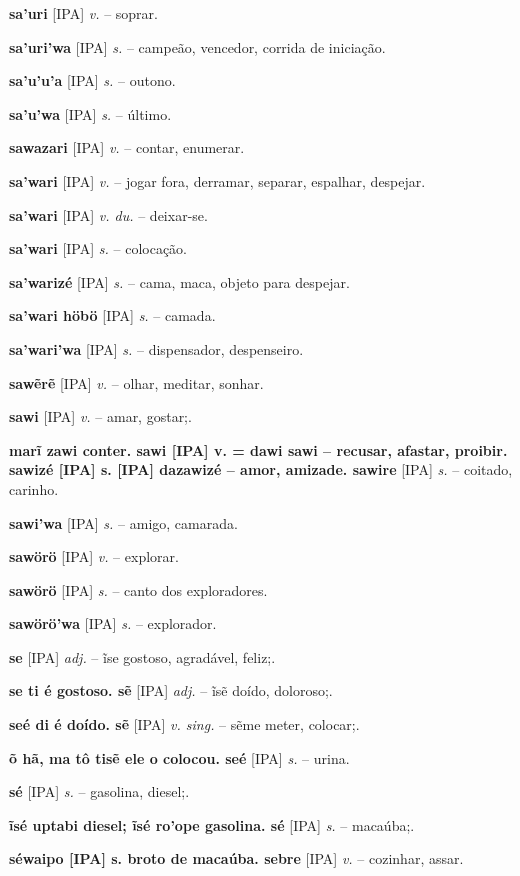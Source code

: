 {\textbf{sa'uri} [IPA] \textit{v.} -- soprar.

\textbf{sa'uri'wa} [IPA] \textit{s.} -- campeão, vencedor, corrida de iniciação.

\textbf{sa'u'u'a} [IPA] \textit{s.} -- outono.

\textbf{sa'u'wa} [IPA] \textit{s.} -- último.

\textbf{sawazari} [IPA] \textit{v.} -- contar, enumerar.

\textbf{sa'wari} [IPA] \textit{v.} -- jogar fora, derramar, separar, espalhar, despejar.

\textbf{sa'wari} [IPA] \textit{v. du.} -- deixar-se.

\textbf{sa'wari} [IPA] \textit{s.} -- colocação.

\textbf{sa'warizé} [IPA] \textit{s.} -- cama, maca, objeto para despejar.

\textbf{sa'wari höbö} [IPA] \textit{s.} -- camada.

\textbf{sa'wari'wa} [IPA] \textit{s.} -- dispensador, despenseiro.

\textbf{sawẽrẽ} [IPA] \textit{v.} -- olhar, meditar, sonhar.

\textbf{sawi} [IPA] \textit{v.} -- amar, gostar;.

\textbf{marĩ zawi conter. sawi [IPA] v. = dawi sawi -- recusar, afastar, proibir. sawizé [IPA] s. [IPA] dazawizé -- amor, amizade. sawire} [IPA] \textit{s.} -- coitado, carinho.

\textbf{sawi'wa} [IPA] \textit{s.} -- amigo, camarada.

\textbf{sawörö} [IPA] \textit{v.} -- explorar.

\textbf{sawörö} [IPA] \textit{s.} -- canto dos exploradores.

\textbf{sawörö'wa} [IPA] \textit{s.} -- explorador.

\textbf{se} [IPA] \textit{adj.} -- ĩse gostoso, agradável, feliz;.

\textbf{se ti é gostoso. sẽ} [IPA] \textit{adj.} -- ĩsẽ doído, doloroso;.

\textbf{seé di é doído. sẽ} [IPA] \textit{v. sing.} -- sẽme meter, colocar;.

\textbf{õ hã, ma tô tisẽ ele o colocou. seé} [IPA] \textit{s.} -- urina.

\textbf{sé} [IPA] \textit{s.} -- gasolina, diesel;.

\textbf{ĩsé uptabi diesel; ĩsé ro'ope gasolina. sé} [IPA] \textit{s.} -- macaúba;.

\textbf{séwaipo [IPA] s. broto de macaúba. sebre} [IPA] \textit{v.} -- cozinhar, assar.

}
